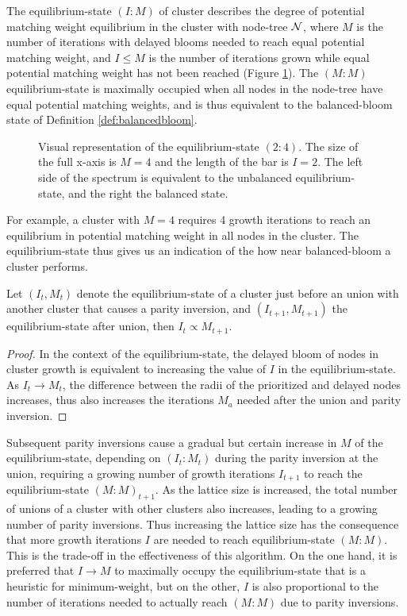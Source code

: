\begin{definition}\label{def:eqstate}
  The equilibrium-state $(I:M)$ of cluster describes the degree of potential matching weight equilibrium in the cluster with node-tree $\mathcal{N}$, where $M$ is the number of iterations with delayed blooms needed to reach equal potential matching weight, and $I\leq M$ is the number of iterations grown while equal potential matching weight has not been reached (Figure \ref{fig:eqstate}). The $(M:M)$ equilibrium-state is maximally occupied when all nodes in the node-tree have equal potential matching weights, and is thus equivalent to the balanced-bloom state of Definition \ref{def:balancedbloom}. 
\end{definition}
\begin{figure}
  \centering
  \caption{Visual representation of the equilibrium-state $(2:4)$. The size of the full x-axis is $M=4$ and the length of the bar is $I=2$. The left side of the spectrum is equivalent to the unbalanced equilibrium-state, and the right the balanced state.}\label{fig:eqstate}
\end{figure}
For example, a cluster with $M=4$ requires 4 growth iterations to reach an equilibrium in potential matching weight in all nodes in the cluster. The equilibrium-state thus gives us an indication of the how near balanced-bloom a cluster performs. 
\begin{lemma}\label{lem:parityinversion}
  Let $(I_t, M_t)$ denote the equilibrium-state of a cluster just before an union with another cluster that causes a parity inversion, and $(I_{t+1}, M_{t+1})$ the equilibrium-state after union, then $I_t \propto M_{t+1}$.
\end{lemma}
\begin{proof}
  In the context of the equilibrium-state, the delayed bloom of nodes in cluster growth is equivalent to increasing the value of $I$ in the equilibrium-state. As $I_t\to M_t$, the difference between the radii of the prioritized and delayed nodes increases, thus also increases the iterations $M_a$ needed after the union and parity inversion. 
\end{proof}
Subsequent parity inversions cause a gradual but certain increase in $M$ of the equilibrium-state, depending on $(I_t:M_t)$ during the parity inversion at the union, requiring a growing number of growth iterations $I_{t+1}$ to reach the equilibrium-state $(M:M)_{t+1}$. As the lattice size is increased, the total number of unions of a cluster with other clusters also increases, leading to a growing number of parity inversions. Thus increasing the lattice size has the consequence that more growth iterations $I$ are needed to reach equilibrium-state $(M:M)$. This is the trade-off in the effectiveness of this algorithm. On the one hand, it is preferred that $I\to M$ to maximally occupy the equilibrium-state that is a heuristic for minimum-weight, but on the other, $I$ is also proportional to the number of iterations needed to actually reach $(M:M)$ due to parity inversions. 

